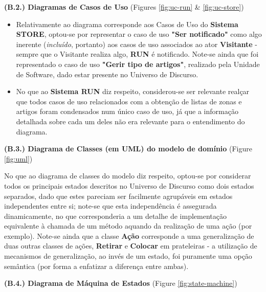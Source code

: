 \documentclass[12pt,a4paper]{article}
\begin{document}
\begin{tcolorbox}[enhanced jigsaw,colback=bg,boxrule=0pt,arc=4pt]
  \begin{small}
    \textbf{(B.2.) Diagramas de Casos de Uso} (Figures \ref{fig:uc-run} \& \ref{fig:uc-store})
  \end{small}
  \begin{itemize}
    \item Relativamente ao diagrama corresponde aos Casos de Uso do \textbf{Sistema STORE},
          optou-se por representar o caso de uso \textbf{"Ser notificado"} como algo
          inerente (\textit{incluído}, portanto) aos casos de uso associados ao ator \textbf{Visitante} -
          sempre que o Visitante realiza algo, \textbf{RUN} é notificado. Note-se ainda que foi representado
          o caso de uso \textbf{"Gerir tipo de artigos"}, realizado pela Unidade de Software,
          dado estar presente no Universo de Discurso.
    \item No que ao \textbf{Sistema RUN} diz respeito, considerou-se ser relevante realçar que todos
          casos de uso relacionados com a obtenção de listas de zonas e artigos foram condensados num
          único caso de uso, já que a informação detalhada sobre cada um deles não era relevante para
          o entendimento do diagrama.
  \end{itemize}

  \begin{small}
    \textbf{(B.3.) Diagrama de Classes (em UML) do modelo de domínio} (Figure \ref{fig:uml})
  \end{small}

  No que ao diagrama de classes do modelo diz respeito, optou-se por considerar todos os
  principais estados descritos no Universo de Discurso como dois estados separados, dado
  que estes pareciam ser facilmente agrupáveis em estados independentes entre si; note-se
  que esta independência é assegurada dinamicamente, no que corresponderia a um detalhe
  de implementação equivalente à chamada de um método aquando da realização de uma ação (por exemplo).
  Note-se ainda que a classe \textbf{Ação} corresponde a uma generalização de duas outras classes
  de ações, \textbf{Retirar} e \textbf{Colocar} em prateleiras - a utilização de mecanismos de generalização,
  ao invés de um estado, foi puramente uma opção semântica (por forma a enfatizar a diferença entre ambas).

  \begin{small}
    \textbf{(B.4.) Diagrama de Máquina de Estados} (Figure \ref{fig:state-machine})
  \end{small}


\end{tcolorbox}
\end{document}
